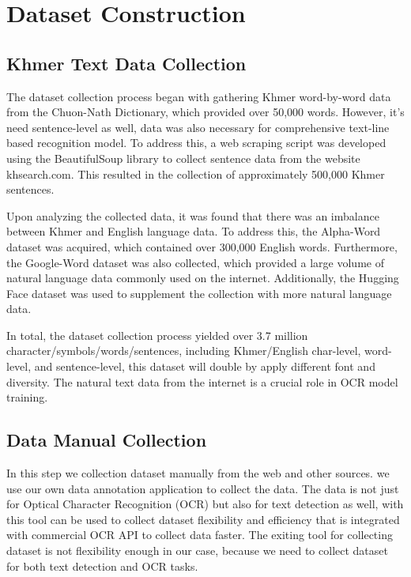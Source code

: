 
\chapter{Dataset Construction}
\label{ch:dataset}


\vspace{-1cm}
\setlength{\parindent}{0pt}
\vspace{0.3cm}

\section{Khmer Text Data Collection}
\label{sec:text-source}

{\englishfont\fontsize{13.5pt}{17pt}\selectfont

The dataset collection process began with gathering Khmer word-by-word data from the 
Chuon-Nath Dictionary, which provided over 50,000 words. However, it's need
sentence-level as well, data was also necessary for comprehensive text-line based recognition model. 
To address this, a web scraping script was developed using the BeautifulSoup library 
to collect sentence data from the website khsearch.com. This resulted in the collection 
of approximately 500,000 Khmer sentences.

Upon analyzing the collected data, it was found that there was an imbalance between 
Khmer and English language data. To address this, the Alpha-Word dataset was acquired,
which contained over 300,000 English words. Furthermore, the Google-Word dataset 
was also collected, which provided a large volume of natural language data commonly 
used on the internet. Additionally, the Hugging Face dataset was used to supplement 
the collection with more natural language data.

In total, the dataset collection process yielded over 3.7 million 
character/symbols/words/sentences, including Khmer/English char-level, word-level, 
and sentence-level, this dataset will double by apply different font and diversity. The natural text data from the internet is a crucial role in
OCR model training.

\section{Data Manual Collection}
\label{sec:manualcollection}
In this step we collection dataset manually from the web and other sources. we 
use our own data annotation application to collect the data. The data is not just for Optical 
Character Recognition (OCR) but also for text detection as well, with this tool can be
used to collect dataset flexibility and efficiency that is integrated with commercial OCR API
to collect data faster. The exiting tool for collecting dataset is not flexibility enough in
our case, because we need to collect dataset for both text detection and OCR tasks.

}
